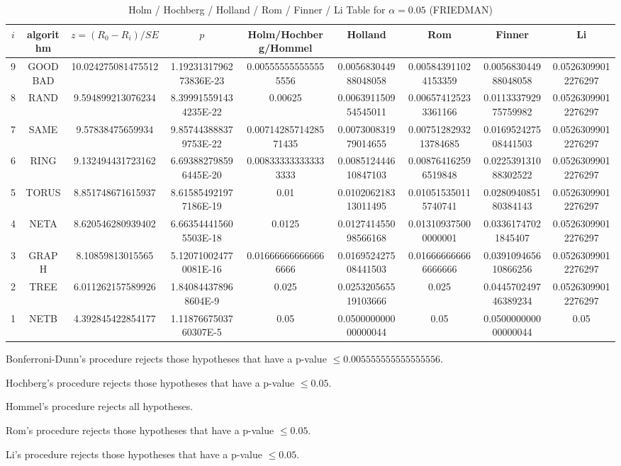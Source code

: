 \documentclass[a4paper,10pt]{article}
\begin{document}
\begin{landscape}
\begin{table}[!htp]
\centering\scriptsize
\caption{Holm / Hochberg / Holland / Rom / Finner / Li Table for $\alpha=0.05$ (FRIEDMAN)}
\begin{tabular}{ccccccccc}
$i$&algorithm&$z=(R_0 - R_i)/SE$&$p$&Holm/Hochberg/Hommel&Holland&Rom&Finner&Li\\
\hline
9& GOODBAD&10.024275081475512&1.1923131796273836E-23&0.005555555555555556&0.005683044988048058&0.005843911024153359&0.005683044988048058&0.05263099012276297\\
8& RAND&9.594899213076234&8.399915591434235E-22&0.00625&0.006391150954545011&0.006574125233361166&0.011333792975759982&0.05263099012276297\\
7& SAME&9.57838475659934&9.857443888379753E-22&0.0071428571428571435&0.007300831979014655&0.0075128293213784685&0.016952427508441503&0.05263099012276297\\
6& RING&9.132494431723162&6.693882798596445E-20&0.008333333333333333&0.008512444610847103&0.008764162596519848&0.022539131088302522&0.05263099012276297\\
5& TORUS&8.851748671615937&8.615854921977186E-19&0.01&0.010206218313011495&0.010515350115740741&0.028094085180384143&0.05263099012276297\\
4& NETA&8.620546280939402&6.663544415605503E-18&0.0125&0.012741455098566168&0.013109375000000001&0.03361747021845407&0.05263099012276297\\
3& GRAPH&8.10859813015565&5.120710024770081E-16&0.016666666666666666&0.016952427508441503&0.016666666666666666&0.039109465610866256&0.05263099012276297\\
2& TREE&6.011262157589926&1.840844378968604E-9&0.025&0.025320565519103666&0.025&0.044570249746389234&0.05263099012276297\\
1& NETB&4.392845422854177&1.1187667503760307E-5&0.05&0.050000000000000044&0.05&0.050000000000000044&0.05\\
\hline
\end{tabular}
\end{table}
Bonferroni-Dunn's procedure rejects those hypotheses that have a p-value $\le0.005555555555555556$.


Hochberg's procedure rejects those hypotheses that have a p-value $\le0.05$.


Hommel's procedure rejects all hypotheses.


Rom's procedure rejects those hypotheses that have a p-value $\le0.05$.


Li's procedure rejects those hypotheses that have a p-value $\le0.05$.




\end{landscape}
\end{document}
